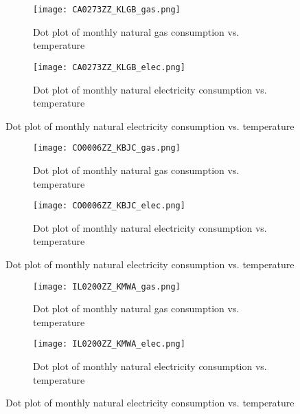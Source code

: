 \documentclass[12pt]{article}
\begin{document}
\begin{figure}[h!]
  \centering
  \begin{subfigure}{.4\textwidth}
  \centering
  \texttt{[image: CA0273ZZ\_KLGB\_gas.png]}
  \caption{Dot plot of monthly natural gas consumption vs. temperature}
  \label{fig:CA0273ZZ_KLGB_gas}
\end{subfigure}
%
\begin{subfigure}{.4\textwidth}
  \centering
  \texttt{[image: CA0273ZZ\_KLGB\_elec.png]}
  \caption{Dot plot of monthly natural electricity consumption vs. temperature}
  \label{fig:CA0273ZZ_KLGB_elec}
\end{subfigure}
\end{figure}

\begin{figure}[h!]
  \centering
  \begin{subfigure}{.4\textwidth}
  \centering
  \texttt{[image: CO0006ZZ\_KBJC\_gas.png]}
  \caption{Dot plot of monthly natural gas consumption vs. temperature}
  \label{fig:CO0006ZZ_KBJC_gas}
\end{subfigure}
%
\begin{subfigure}{.4\textwidth}
  \centering
  \texttt{[image: CO0006ZZ\_KBJC\_elec.png]}
  \caption{Dot plot of monthly natural electricity consumption vs. temperature}
  \label{fig:CO0006ZZ_KBJC_elec}
\end{subfigure}
\end{figure}

\begin{figure}[h!]
  \centering
  \begin{subfigure}{.4\textwidth}
  \centering
  \texttt{[image: IL0200ZZ\_KMWA\_gas.png]}
  \caption{Dot plot of monthly natural gas consumption vs. temperature}
  \label{fig:IL0200ZZ_KMWA_gas}
\end{subfigure}
%
\begin{subfigure}{.4\textwidth}
  \centering
  \texttt{[image: IL0200ZZ\_KMWA\_elec.png]}
  \caption{Dot plot of monthly natural electricity consumption vs. temperature}
  \label{fig:IL0200ZZ_KMWA_elec}
\end{subfigure}
\end{figure}

\newpage
 
\end{document}
